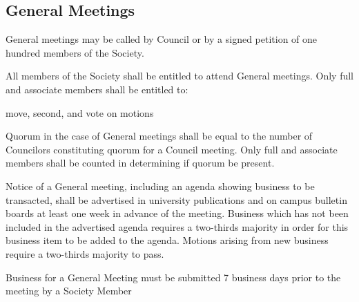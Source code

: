 \subsection{General Meetings}
\begin{longenum}[ label*=\thesubsection.\arabic*., align=left] 
	\item General meetings may be called by Council or by a signed petition of one hundred members of the Society.
    

    \item All members of the Society shall be entitled to attend General meetings. Only full and associate members  shall be entitled to:
    \begin{longenum}[ label*=\arabic*., align=left]
		\item move, second, and vote on motions
	\end{longenum}
    \item Quorum in the case of General meetings shall be equal to the number of Councilors constituting quorum for a Council meeting. Only full and associate members shall be counted in determining if quorum be present.
    \item Notice of a General meeting, including an agenda showing business to be transacted, shall be advertised in university publications and on campus bulletin boards at least one week in advance of the meeting. Business which has not been included in the advertised agenda requires a two-thirds majority in order for this business item to be added to the agenda. Motions arising from new business require a two-thirds majority to pass.
	\item  Business for a General Meeting must be submitted 7 business days prior to the meeting by a Society Member 

\end{longenum}

